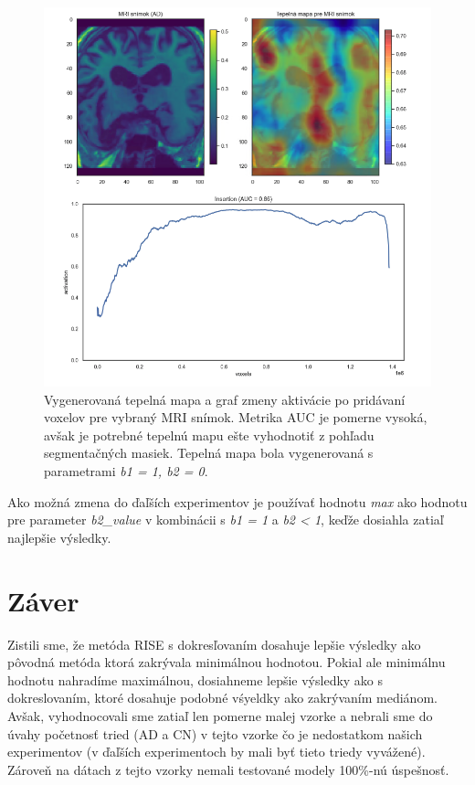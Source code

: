 \begin{figure}[h!]
    \centering
    \includegraphics[width=14cm]{assets/images/heatmap_and_auc_example.png}
    \caption{Vygenerovaná tepelná mapa a graf zmeny aktivácie po pridávaní voxelov pre vybraný MRI snímok. Metrika AUC je pomerne vysoká, avšak je potrebné tepelnú mapu ešte vyhodnotiť z pohľadu segmentačných masiek. Tepelná mapa bola vygenerovaná s parametrami \textit{b1 = 1, b2 = 0}.}
    \label{fig:heatmap_and_auc_example}
\end{figure}

Ako možná zmena do ďaľších experimentov je používať hodnotu \textit{max} ako hodnotu pre parameter \textit{b2\_value} v kombinácii s \textit{b1 = 1} a \textit{b2 < 1}, keďže dosiahla zatiaľ najlepšie výsledky.

\section{Záver}

Zistili sme, že metóda RISE s dokresľovaním dosahuje lepšie výsledky ako pôvodná metóda ktorá zakrývala minimálnou hodnotou. Pokial ale minimálnu hodnotu nahradíme maximálnou, dosiahneme lepšie výsledky ako s dokreslovaním, ktoré dosahuje podobné vśyeldky ako zakrývaním mediánom. Avšak, vyhodnocovali sme zatiaľ len pomerne malej vzorke a nebrali sme do úvahy početnosť tried (AD a CN) v tejto vzorke čo je nedostatkom našich experimentov (v ďaľších experimentoch by mali byť tieto triedy vyvážené). Zároveň na dátach z tejto vzorky nemali testované modely 100\%-nú úspešnosť.

